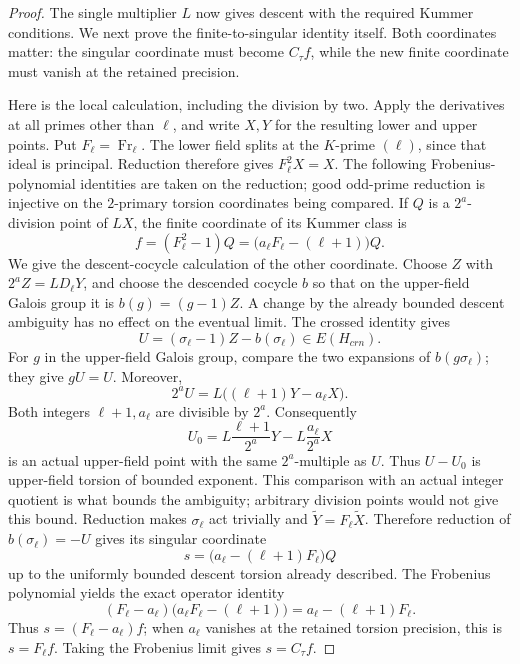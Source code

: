\begin{proof}
The single multiplier $L$ now gives descent with the required Kummer
conditions. We next prove the finite-to-singular identity itself. Both
coordinates matter: the singular coordinate must become $C_\tau f$,
while the new finite coordinate must vanish at the retained precision.

Here is the local calculation, including the division by two.  Apply
the derivatives at all primes other than \(\ell\), and write \(X,Y\)
for the resulting lower and upper points.  Put \(F_\ell=\operatorname{Fr}_\ell\).
The lower field splits at the \(K\)-prime \((\ell)\), since that ideal
is principal.  Reduction therefore gives \(F_\ell^2X=X\).
The following Frobenius-polynomial identities are taken on the reduction;
good odd-prime reduction is injective on the $2$-primary torsion
coordinates being compared.
If \(Q\) is a \(2^a\)-division point of \(LX\), the finite coordinate
of its Kummer class is
\begin{equation}
 f=(F_\ell^2-1)Q=
       \bigl(a_\ell F_\ell-(\ell+1)\bigr)Q.
 \label{rd:finite-formula}
\end{equation}
We give the descent-cocycle calculation of the other coordinate.
Choose \(Z\) with \(2^aZ=LD_\ell Y\), and choose the descended
cocycle \(b\) so that on the upper-field Galois group it is
\(b(g)=(g-1)Z\).  A change by the already bounded descent ambiguity
has no effect on the eventual limit.  The crossed identity gives
\[
 U=(\sigma_\ell-1)Z-b(\sigma_\ell)
                  \in E(H_{crn}).
 \]
For \(g\) in the upper-field Galois group, compare the two
expansions of \(b(g\sigma_\ell)\); they give \(gU=U\).
Moreover,
\[
 2^aU=L\bigl((\ell+1)Y-a_\ell X\bigr).
 \]
Both integers \(\ell+1,a_\ell\) are divisible by \(2^a\).
Consequently
\[
 U_0=L\frac{\ell+1}{2^a}Y-
                      L\frac{a_\ell}{2^a}X
 \]
is an actual upper-field point with the same \(2^a\)-multiple
as \(U\).  Thus \(U-U_0\) is upper-field torsion of bounded
exponent.  This comparison with an actual integer quotient
is what bounds the ambiguity; arbitrary division points
would not give this bound.  Reduction makes
\(\sigma_\ell\) act trivially and
\(\widetilde Y=F_\ell\widetilde X\).  Therefore
reduction of \(b(\sigma_\ell)=-U\) gives its singular coordinate
\begin{equation}
 s=\bigl(a_\ell-(\ell+1)F_\ell\bigr)Q
 \label{rd:singular-formula}
\end{equation}
up to the uniformly bounded descent torsion already described.
The Frobenius polynomial yields the exact operator identity
\begin{equation}
 (F_\ell-a_\ell)
     \bigl(a_\ell F_\ell-(\ell+1)\bigr)
       =a_\ell-(\ell+1)F_\ell.
 \label{rd:exact-frobenius}
\end{equation}
Thus \(s=(F_\ell-a_\ell)f\); when \(a_\ell\) vanishes at the
retained torsion precision, this is \(s=F_\ell f\).  Taking the
Frobenius limit gives \(s=C_\tau f\).


\end{proof}
